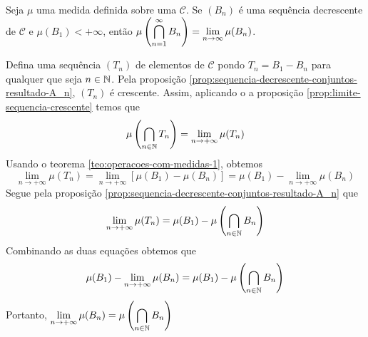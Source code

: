 \begin{proposition}
Seja $\mu$ uma medida definida sobre uma \sigal $\mathcal{C}$.
Se $(B_n)$ é uma sequência decrescente de $\mathcal{C}$ e $\mu(B_1) < +\infty$, então 
$\mu\left(\displaystyle \bigcap_{n = 1}^\infty B_n\right) = \displaystyle \lim_{n \to \infty} \mu(B_n)$.
\end{proposition} 
\begin{prova}
    Defina uma sequência $(T_n)$ de elementos de $\mathcal{C}$ pondo $T_n = B_1 - B_n$ para qualquer que seja $n \in \operatorname{\mathbb{N}}$.
    Pela proposição \ref{prop:sequencia-decrescente-conjuntos-resultado-A_n}, $(T_n)$ é crescente.
    Assim, aplicando o a proposição \ref{prop:limite-sequencia-crescente} temos que 
    $$
    \mu\left(\bigcap_{n \in \operatorname{\mathbb{N}}} T_n\right) = \lim_{n \to +\infty} \mu(T_n)
    $$
    Usando o teorema \ref{teo:operacoes-com-medidas-1}, obtemos
    $$
    \lim_{n \to +\infty} \mu(T_n) = \lim_{n \to +\infty} [\mu(B_1) - \mu(B_n)] = \mu(B_1) - \lim_{n \to +\infty} \mu(B_n)
    $$
    Segue pela proposição \ref{prop:sequencia-decrescente-conjuntos-resultado-A_n} que 
    $$
    \lim_{n \to +\infty} \mu(T_n) = \mu(B_1) - \mu\left(\bigcap_{n \in \operatorname{\mathbb{N}}} B_n\right)
    $$
    Combinando as duas equações obtemos que
    \begin{align*}
        \mu(B_1) - \lim_{n \to +\infty} \mu(B_n) = \mu(B_1) - \mu\left(\bigcap_{n \in \operatorname{\mathbb{N}}} B_n\right)
    \end{align*}
    Portanto, $\displaystyle \lim_{n \to +\infty} \mu(B_n) = \mu\left(\bigcap_{n \in \operatorname{\mathbb{N}}} B_n\right)$
\end{prova}


